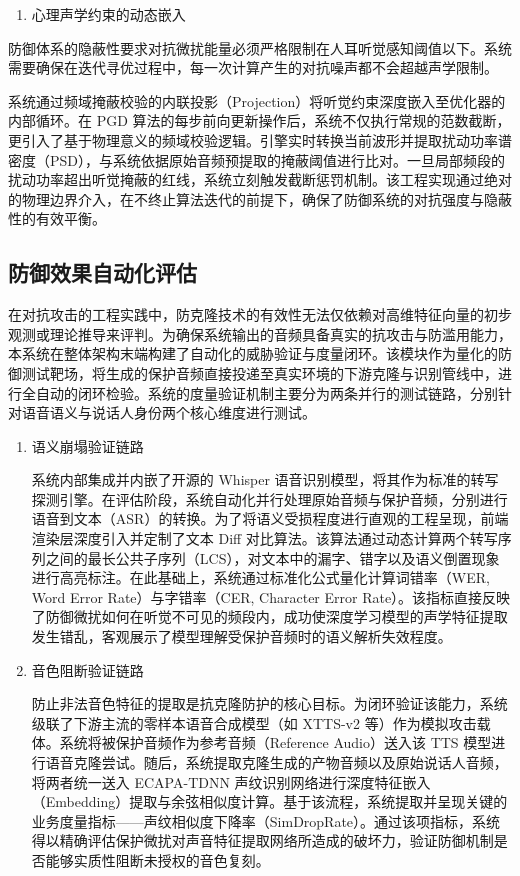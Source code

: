 \begin{enumerate}
\def\labelenumi{\arabic{enumi}.}
\setcounter{enumi}{2}
\item
  心理声学约束的动态嵌入
\end{enumerate}

防御体系的隐蔽性要求对抗微扰能量必须严格限制在人耳听觉感知阈值以下。系统需要确保在迭代寻优过程中，每一次计算产生的对抗噪声都不会超越声学限制。

系统通过频域掩蔽校验的内联投影（Projection）将听觉约束深度嵌入至优化器的内部循环。在
PGD
算法的每步前向更新操作后，系统不仅执行常规的范数截断，更引入了基于物理意义的频域校验逻辑。引擎实时转换当前波形并提取扰动功率谱密度（PSD），与系统依据原始音频预提取的掩蔽阈值进行比对。一旦局部频段的扰动功率超出听觉掩蔽的红线，系统立刻触发截断惩罚机制。该工程实现通过绝对的物理边界介入，在不终止算法迭代的前提下，确保了防御系统的对抗强度与隐蔽性的有效平衡。

\subsection{防御效果自动化评估}\label{ux653bux9632ux9a8cux8bc1ux6c99ux7bb1ux4e0eux591aux7ef4ux6548ux80fdux5ea6ux91cf}

在对抗攻击的工程实践中，防克隆技术的有效性无法仅依赖对高维特征向量的初步观测或理论推导来评判。为确保系统输出的音频具备真实的抗攻击与防滥用能力，本系统在整体架构末端构建了自动化的威胁验证与度量闭环。该模块作为量化的防御测试靶场，将生成的保护音频直接投递至真实环境的下游克隆与识别管线中，进行全自动的闭环检验。系统的度量验证机制主要分为两条并行的测试链路，分别针对语音语义与说话人身份两个核心维度进行测试。

\begin{enumerate}
\def\labelenumi{\arabic{enumi}.}
\item
  语义崩塌验证链路

  系统内部集成并内嵌了开源的 Whisper
  语音识别模型，将其作为标准的转写探测引擎。在评估阶段，系统自动化并行处理原始音频与保护音频，分别进行语音到文本（ASR）的转换。为了将语义受损程度进行直观的工程呈现，前端渲染层深度引入并定制了文本
  Diff
  对比算法。该算法通过动态计算两个转写序列之间的最长公共子序列（LCS），对文本中的漏字、错字以及语义倒置现象进行高亮标注。在此基础上，系统通过标准化公式量化计算词错率（WER,
  Word Error Rate）与字错率（CER, Character Error
  Rate）。该指标直接反映了防御微扰如何在听觉不可见的频段内，成功使深度学习模型的声学特征提取发生错乱，客观展示了模型理解受保护音频时的语义解析失效程度。
\item
  音色阻断验证链路

  防止非法音色特征的提取是抗克隆防护的核心目标。为闭环验证该能力，系统级联了下游主流的零样本语音合成模型（如
  XTTS-v2 等）作为模拟攻击载体。系统将被保护音频作为参考音频（Reference
  Audio）送入该 TTS
  模型进行语音克隆尝试。随后，系统提取克隆生成的产物音频以及原始说话人音频，将两者统一送入
  ECAPA-TDNN
  声纹识别网络进行深度特征嵌入（Embedding）提取与余弦相似度计算。基于该流程，系统提取并呈现关键的业务度量指标------声纹相似度下降率（SimDropRate）。通过该项指标，系统得以精确评估保护微扰对声音特征提取网络所造成的破坏力，验证防御机制是否能够实质性阻断未授权的音色复刻。
\end{enumerate}

